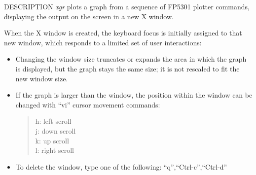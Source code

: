 \begin{synopsis}
 \item[xgr]   [ --s {\em S} ] [ --l ] [ --rv ] [ --m ] [ --bg {\em BG} ]
              [ --hl {\em HL} ] [ --bd {\em BD} ] 
 \item[\ ~~~~] [ --ms {\em MS} ] [ --g {\em G} ] [ --d {\em D} ]
              [ --t {\em T} ] [ {\em infile} ]
\end{synopsis} 

\begin{qsection}{DESCRIPTION}
{\em xgr} plots a graph from a sequence of FP5301 plotter commands, 
displaying the output on the screen in a new X window.

When the X window is created, 
the keyboard focus is initially assigned to that new window, 
which responds to a limited set of user interactions:
\begin{itemize}
\item Changing the window size truncates or expands the area 
	in which the graph is displayed, 
	but the graph stays the same size; 
	it is not rescaled to fit the new window size.
\item If the graph is larger than the window, 
	the position within the window can be changed with 
	``vi'' cursor movement commands:
\begin{quote}
		h: left scroll\\
		j: down scroll\\
		k: up scroll\\
		l: right scroll
\end{quote}
\item To delete the window, type one of the following:
	``q'',``Ctrl-c'',``Ctrl-d''
\end{itemize}
\end{qsection}

